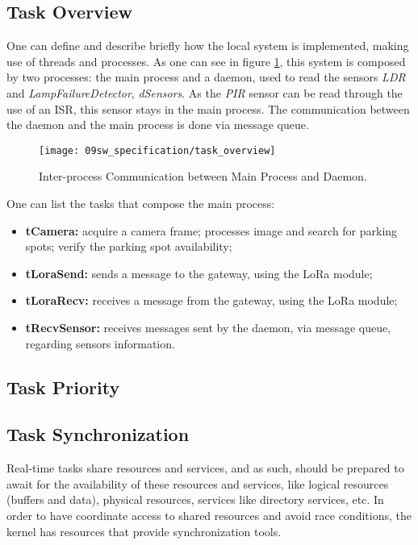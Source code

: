 \subsection{Task Overview}
One can define and describe briefly how the local system is implemented, making use of threads and processes. As one can see in figure \ref{fig:task_overview}, this system is composed by two processes: the main process and a daemon, used to read the sensors \textit{LDR} and \textit{LampFailureDetector}, \textit{dSensors}. As the \textit{PIR} sensor can be read through the use of an ISR, this sensor stays in the main process. The communication between the daemon and the main process is done via message queue.

\begin{figure}[H]
	\centering
	\texttt{[image: 09sw\_specification/task\_overview]}
	\caption{Inter-process Communication between Main Process and Daemon.}
	\label{fig:task_overview}
\end{figure}

\clearpage
One can list the tasks that compose the main process:
\begin{itemize}
	\item \textbf{tCamera:} acquire a camera frame; processes image and search for parking spots; verify the parking spot availability;
	\item \textbf{tLoraSend:} sends a message to the gateway, using the LoRa module;
	\item \textbf{tLoraRecv:} receives a message from the gateway, using the LoRa module;
	\item \textbf{tRecvSensor:} receives messages sent by the daemon, via message queue, regarding sensors information.
\end{itemize}

\subsection{Task Priority}

\subsection{Task Synchronization}
Real-time tasks share resources and services, and as such, should be prepared to await for the availability of these resources and services, like logical resources (buffers and data), physical resources, services like directory services, etc. In order to have coordinate access to shared resources and avoid race conditions, the kernel has resources that provide synchronization tools. 


